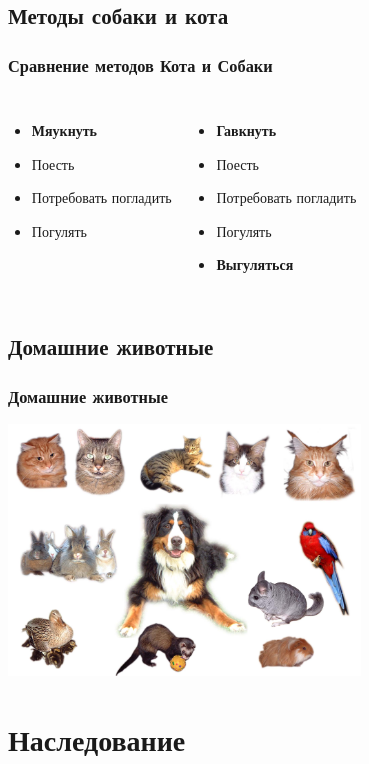 \documentclass[compress,red]{beamer}
\begin{document}
\subsection{Методы собаки и кота}
\begin{frame}[fragile]
  \frametitle{Сравнение методов Кота и Собаки}
  \begin{columns}[ll]
    \column{2.0in}
      \begin{itemize}
        \item \textbf{Мяукнуть}
        \item Поесть
        \item Потребовать погладить
        \item Погулять
      \end{itemize}
    \column{2.0in}
    \begin{itemize}
      \item \textbf{Гавкнуть}
      \item Поесть
      \item Потребовать погладить
      \item Погулять
      \item \textbf{Выгуляться}
    \end{itemize}
  \end{columns}
\end{frame}

\subsection{Домашние животные}
\begin{frame}[fragile]
  \frametitle{Домашние животные}
  \centerline{\includegraphics[width=0.7\textwidth]{images/home_animals.jpg}}
\end{frame}

\section{Наследование}
\end{document}
